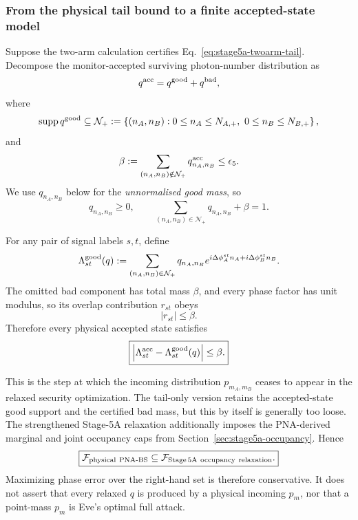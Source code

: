 \documentclass[11pt]{article}
\theoremstyle{remark}
\begin{document}
\subsubsection{From the physical tail bound to a finite accepted-state model}

Suppose the two-arm calculation certifies Eq.~\eqref{eq:stage5a-twoarm-tail}.
Decompose the monitor-accepted surviving photon-number distribution as
\begin{equation}
    q^{\rm acc}
    =
    q^{\rm good}
    +
    q^{\rm bad},
    \label{eq:stage5a-good-bad}
\end{equation}
where
\[
    \operatorname{supp}q^{\rm good}
    \subseteq
    \mathcal N_+
    :=
    \left\{
      (n_A,n_B):
      0\le n_A\le N_{A,+},\
      0\le n_B\le N_{B,+}
    \right\},
\]
and
\begin{equation}
    \beta
    :=
    \sum_{(n_A,n_B)\notin\mathcal N_+}
    q^{\rm acc}_{n_A,n_B}
    \le
    \epsilon_5.
    \label{eq:stage5a-beta}
\end{equation}
We use \(q_{n_A,n_B}\) below for the \emph{unnormalised good mass}, so
\begin{equation}
    q_{n_A,n_B}\ge0,
    \qquad
    \sum_{(n_A,n_B)\in\mathcal N_+}
    q_{n_A,n_B}
    +
    \beta
    =
    1.
    \label{eq:stage5a-q-normalization}
\end{equation}

For any pair of signal labels \(s,t\), define
\begin{equation}
    \Lambda_{st}^{\rm good}(q)
    :=
    \sum_{(n_A,n_B)\in\mathcal N_+}
    q_{n_A,n_B}
    e^{
      i\Delta\phi_A^{st}n_A
      +
      i\Delta\phi_B^{st}n_B
    }.
    \label{eq:stage5a-good-overlap}
\end{equation}
The omitted bad component has total mass \(\beta\), and every phase factor has
unit modulus, so its overlap contribution \(r_{st}\) obeys
\[
    |r_{st}|\le\beta.
\]
Therefore every physical accepted state satisfies
\begin{equation}
    \boxed{
    \left|
      \Lambda_{st}^{\rm acc}
      -
      \Lambda_{st}^{\rm good}(q)
    \right|
    \le
    \beta.
    }
    \label{eq:stage5a-overlap-tail}
\end{equation}

This is the step at which the incoming distribution \(p_{m_A,m_B}\) ceases to
appear in the relaxed security optimization.  The tail-only version retains
the accepted-state good support and the certified bad mass, but this by itself
is generally too loose.  The strengthened Stage-5A relaxation additionally
imposes the PNA-derived marginal and joint occupancy caps from
Section~\ref{sec:stage5a-occupancy}.  Hence
\begin{equation}
    \boxed{
    \mathcal F_{\rm physical\ PNA\text{-}BS}
    \subseteq
    \mathcal F_{\rm Stage\,5A\ occupancy\ relaxation}.
    }
    \label{eq:stage5a-feasible-inclusion}
\end{equation}
Maximizing phase error over the right-hand set is therefore conservative.  It
does not assert that every relaxed \(q\) is produced by a physical incoming
\(p_m\), nor that a point-mass \(p_m\) is Eve's optimal full attack.
\end{document}
